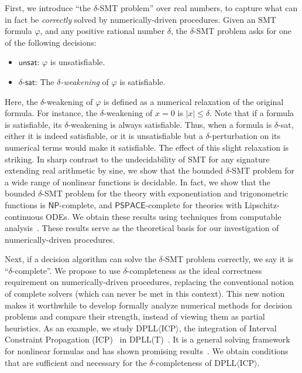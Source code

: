 \documentclass[envcountsect]{llncs}
\begin{document}
First, we introduce ``the $\delta$-SMT problem'' over real numbers, to capture what can in fact be {\em correctly} solved by numerically-driven procedures. Given an SMT formula $\varphi$, and any positive rational number $\delta$, the $\delta$-SMT problem asks for one of the following decisions:
\begin{itemize}
\item $\mathsf{unsat}$: $\varphi$ is unsatisfiable.
\item $\delta$-$\mathsf{sat}$: The {\em $\delta$-weakening} of $\varphi$ is satisfiable. 
\end{itemize}
Here, the $\delta$-weakening of $\varphi$ is defined as a numerical relaxation of the original formula. For instance, the $\delta$-weakening of $x=0$ is $|x|\leq\delta$. Note that if a formula is satisfiable, its $\delta$-weakening is always satisfiable. Thus, when a formula is $\delta$-{\sf sat}, either it is indeed satisfiable, or it is unsatisfiable but a $\delta$-perturbation on its numerical terms would make it satisfiable. The effect of this slight relaxation is striking. In sharp contrast to the undecidability of SMT for any signature extending real arithmetic by sine, we show that the bounded $\delta$-SMT problem for a wide range of nonlinear functions is decidable. 
In fact, we show that the bounded $\delta$-SMT problem for the theory with exponentiation and trigonometric functions is $\mathsf{NP}$-complete, and $\mathsf{PSPACE}$-complete for theories with Lipschitz-continuous ODEs. We obtain these results using techniques from computable analysis~\cite{CAbook,vasco}. These results serve as the theoretical basis for our investigation of numerically-driven procedures. 

Next, if a decision algorithm can solve the $\delta$-SMT problem correctly, we say it is ``$\delta$-complete''. We propose to use $\delta$-completeness as the ideal correctness requirement on numerically-driven procedures, replacing the conventional notion of complete solvers (which can never be met in this context). This new notion makes it worthwhile to develop formally analyze numerical methods for decision problems and compare their strength, instead of viewing them as partial heuristics. As an example, we study DPLL$\langle$ICP$\rangle$, the integration of Interval Constraint Propagation (ICP)~\cite{newton} in DPLL(T)~\cite{DPbook}. It is a general solving framework for nonlinear formulas and has shown promising results~\cite{HySAT,DBLP:conf/fmcad/Gao10,DBLP:conf/sefm/EggersRNF11}. We obtain conditions that are sufficient and necessary for the $\delta$-completeness of DPLL$\langle$ICP$\rangle$. 
\end{document}
